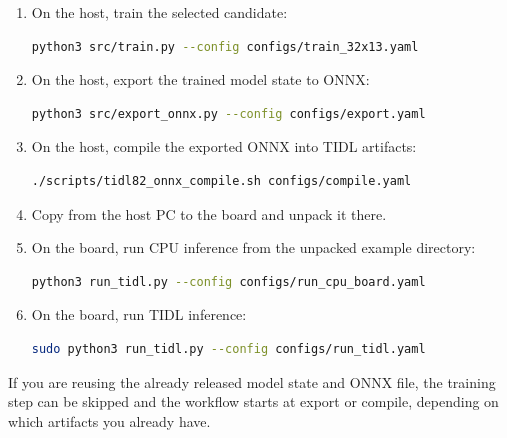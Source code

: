 \documentclass[11pt,a4paper]{article}
\begin{document}
\begin{enumerate}
\item On the host, train the selected candidate:
\begin{lstlisting}[language=bash]
python3 src/train.py --config configs/train_32x13.yaml
\end{lstlisting}
\item On the host, export the trained model state to ONNX:
\begin{lstlisting}[language=bash]
python3 src/export_onnx.py --config configs/export.yaml
\end{lstlisting}
\item On the host, compile the exported ONNX into TIDL artifacts:
\begin{lstlisting}[language=bash]
./scripts/tidl82_onnx_compile.sh configs/compile.yaml
\end{lstlisting}
\item Copy  from the host PC to the board and unpack it there.
\item On the board, run CPU inference from the unpacked example directory:
\begin{lstlisting}[language=bash]
python3 run_tidl.py --config configs/run_cpu_board.yaml
\end{lstlisting}
\item On the board, run TIDL inference:
\begin{lstlisting}[language=bash]
sudo python3 run_tidl.py --config configs/run_tidl.yaml
\end{lstlisting}
\end{enumerate}

If you are reusing the already released model state and ONNX file, the training step can be skipped and the workflow starts at export or compile, depending on which artifacts you already have.
\end{document}
